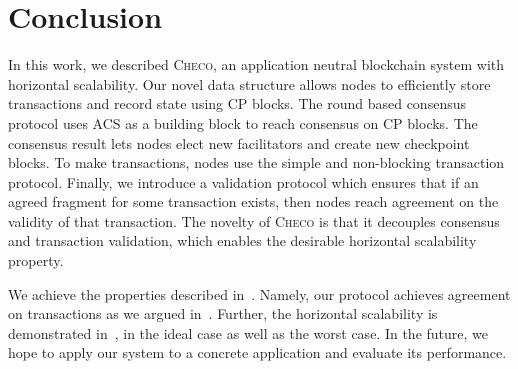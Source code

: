 \section{Conclusion}
\label{sec:conclusion}

In this work, we described \textsc{Checo}, an application neutral blockchain system with horizontal scalability.
Our novel data structure allows nodes to efficiently store transactions and record state using CP blocks.
The round based consensus protocol uses ACS as a building block to reach consensus on CP blocks.
The consensus result lets nodes elect new facilitators and create new checkpoint blocks.
To make transactions, nodes use the simple and non-blocking transaction protocol.
Finally, we introduce a validation protocol which ensures that if an agreed fragment for some transaction exists,
then nodes reach agreement on the validity of that transaction.
The novelty of \textsc{Checo} is that it decouples consensus and transaction validation,
which enables the desirable horizontal scalability property.

We achieve the properties described in~.
Namely, our protocol achieves agreement on transactions as we argued in~.
Further, the horizontal scalability is demonstrated in~,
in the ideal case as well as the worst case.
In the future, we hope to apply our system to a concrete application and evaluate its performance.

